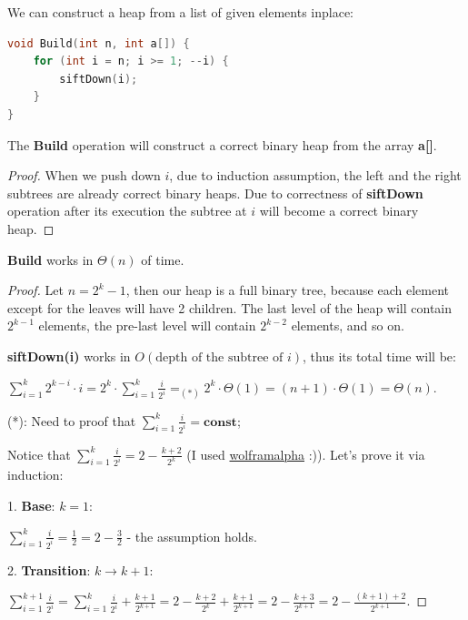 
We can construct a heap from a list of given elements inplace:

\begin{lstlisting}[language=C++]
void Build(int n, int a[]) {
    for (int i = n; i >= 1; --i) {
        siftDown(i);
    }
}
\end{lstlisting}

\begin{lemma}
    The \textbf{Build} operation will construct a correct binary heap from the array \textbf{a[]}.
\end{lemma}

\begin{proof}
    When we push down $i$, due to induction assumption, the left and the right subtrees are already correct binary heaps. Due to correctness of \textbf{siftDown} operation after its execution the subtree at $i$ will become a correct binary heap.
\end{proof}

\begin{lemma}
    \textbf{Build} works in $\Theta(n)$ of time.
\end{lemma}

\begin{proof}
    Let $n = 2^k-1$, then our heap is a full binary tree, because each element except for the leaves will have 2 children. The last level of the heap will contain $2^{k-1}$ elements, the pre-last level will contain $2^{k-2}$ elements, and so on.

    \textbf{siftDown(i)} works in $O(\text{depth of the subtree of $i$})$, thus its total time will be:

    $\sum_{i=1}^{k} 2^{k-i} \cdot i = 2^k \cdot \sum_{i=1}^{k} \frac{i}{2^i} =_{(*)} 2^k \cdot \Theta(1) = (n+1) \cdot \Theta(1) = \Theta(n)$.

    (*): Need to proof that $\sum_{i=1}^{k} \frac{i}{2^i} = \textbf{const}$;

    Notice that $\sum_{i=1}^{k} \frac{i}{2^i} = 2 - \frac{k+2}{2^k}$ (I used \href{https://www.wolframalpha.com/}{wolframalpha} :)). Let's prove it via induction:

    1. \textbf{Base}: $k=1$:

    $\sum_{i=1}^{k} \frac{i}{2^i} = \frac{1}{2} = 2 - \frac{3}{2}$ - the assumption holds.

    2. \textbf{Transition}: $k \to k+1$:

    $\sum_{i=1}^{k+1} \frac{i}{2^i} = \sum_{i=1}^{k} \frac{i}{2^i} + \frac{k+1}{2^{k+1}} = 2 - \frac{k+2}{2^k} + \frac{k+1}{2^{k+1}} = 2 - \frac{k+3}{2^{k+1}} = 2 - \frac{(k+1)+2}{2^{k+1}}$.

\end{proof}

